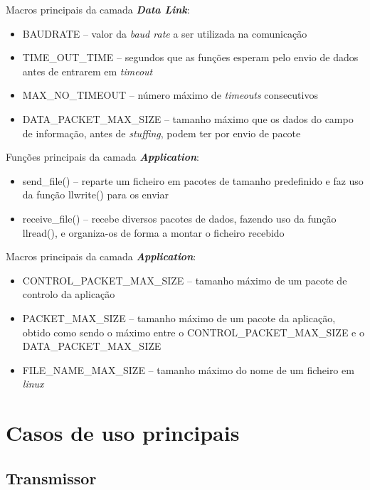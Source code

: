 \documentclass[a4paper,11pt,portuguese]{article}
\begin{document}
    \hfill \break
    \noindent Macros principais da camada \textbf{\textit{Data Link}}:
    \begin{itemize}
        \item BAUDRATE -- valor da \textit{baud rate} a ser utilizada na comunicação
        \item TIME\_OUT\_TIME -- segundos que as funções esperam pelo 
        envio de dados antes de entrarem em \textit{timeout}
        \item MAX\_NO\_TIMEOUT -- número máximo de \textit{timeouts} consecutivos
        \item DATA\_PACKET\_MAX\_SIZE -- tamanho máximo que os dados do campo de informação,
        antes de \textit{stuffing}, podem ter por envio de pacote
    \end{itemize}

    \hfill \break
    \noindent Funções principais da camada \textbf{\textit{Application}}:
    \begin{itemize}
        \item send\_file() -- reparte um ficheiro em pacotes de tamanho predefinido e faz uso da função 
        llwrite() para os enviar
        \item receive\_file() -- recebe diversos pacotes de dados, fazendo uso da função llread(), 
        e organiza-os de forma a montar o ficheiro recebido
    \end{itemize}
    
    \hfill \break
    \noindent Macros principais da camada \textbf{\textit{Application}}:
    \begin{itemize}
        \item CONTROL\_PACKET\_MAX\_SIZE -- tamanho máximo de um pacote de controlo da aplicação
        \item PACKET\_MAX\_SIZE -- tamanho máximo de um pacote da aplicação, obtido como sendo
        o máximo entre o CONTROL\_PACKET\_MAX\_SIZE e o DATA\_PACKET\_MAX\_SIZE
        \item FILE\_NAME\_MAX\_SIZE -- tamanho máximo do nome de um ficheiro em \textit{linux}
    \end{itemize}

\section{Casos de uso principais}

    \subsection{Transmissor}
    
\end{document}
